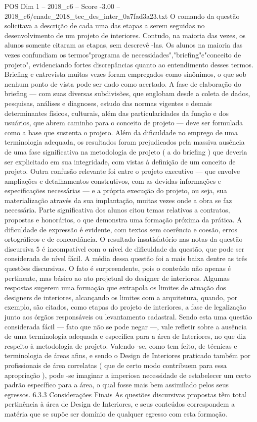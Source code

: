 \begin{textsample}{POS Dim 1 – 2018\_c6 – Score -3.00 – 2018\_c6/enade\_2018\_tec\_des\_inter\_0a7fad3a23.txt}
O comando da questão solicitava a descrição de cada uma das etapas a serem seguidas no desenvolvimento de um projeto de interiores.
Contudo, na maioria das vezes, os alunos somente citaram as etapas, sem descrevê -las.
Os alunos na maioria das vezes confundiam os termos"programa de necessidades","briefing"e"conceito de projeto", evidenciando fortes discrepâncias quanto ao entendimento desses termos.
Briefing e entrevista muitas vezes foram empregados como sinônimos, o que sob nenhum ponto de vista pode ser dado como acertado.
A fase de elaboração do briefing — com suas diversas subdivisões, que englobam desde a coleta de dados, pesquisas, análises e diagnoses, estudo das normas vigentes e demais determinantes físicos, culturais, além das particularidades da função e dos usuários, que abrem caminho para o conceito de projeto — deve ser formulada como a base que sustenta o projeto.
Além da dificuldade no emprego de uma terminologia adequada, os resultados foram prejudicados pela massiva ausência de uma fase significativa na metodologia de projeto ( a do briefing ) que deveria ser explicitado em sua integridade, com vistas à definição de um conceito de projeto.
Outra confusão relevante foi entre o projeto executivo — que envolve ampliações e detalhamentos construtivos, com as devidas informações e especificações necessárias — e a própria execução do projeto, ou seja, sua materialização através da sua implantação, muitas vezes onde a obra se faz necessária.
Parte significativa dos alunos citou temas relativos a contratos, propostas e honorários, o que demonstra uma formação próxima da prática.
A dificuldade de expressão é evidente, com textos sem coerência e coesão, erros ortográficos e de concordância.
O resultado insatisfatório nas notas da questão discursiva 5 é incompatível com o nível de dificuldade da questão, que pode ser considerada de nível fácil.
A média dessa questão foi a mais baixa dentre as três questões discursivas.
O fato é surpreendente, pois o conteúdo não apenas é pertinente, mas básico ao ato projetual do designer de interiores.
Algumas respostas sugerem uma formação que extrapola os limites de atuação dos designers de interiores, alcançando os limites com a arquitetura, quando, por exemplo, são citados, como etapas do projeto de interiores, a fase de legalização junto aos órgãos responsáveis ou levantamento cadastral.
Sendo esta uma questão considerada fácil — fato que não se pode negar —, vale refletir sobre a ausência de uma terminologia adequada e específica para a área de Interiores, no que diz respeito à metodologia de projeto.
Valendo -se, como tem feito, de técnicas e terminologia de áreas afins, e sendo o Design de Interiores praticado também por profissionais de área correlatas ( que de certo modo contribuem para essa apropriação ), pode -se imaginar a imperiosa necessidade de estabelecer um certo padrão específico para a área, o qual fosse mais bem assimilado pelos seus egressos. 6.3.3 Considerações Finais As questões discursivas propostas têm total pertinência à área de Design de Interiores, e seus conteúdos correspondem a matéria que se supõe ser domínio de qualquer egresso com esta formação.

\end{textsample}
